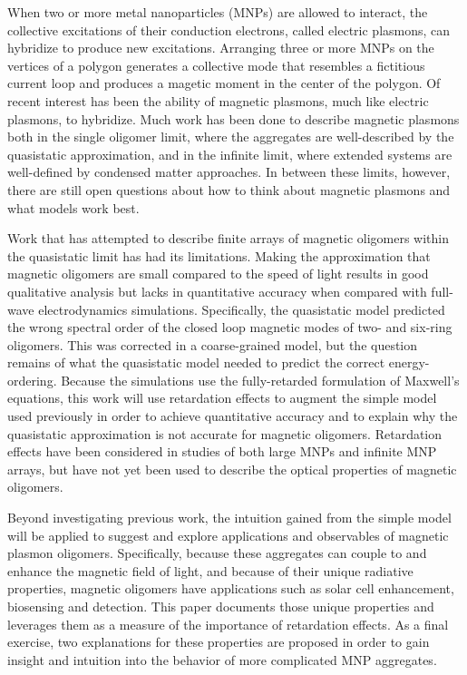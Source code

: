 \documentclass[12pt, letterpaper, twoside]{report}
\begin{document}
When two or more metal nanoparticles (MNPs) are allowed to interact, the collective excitations of their conduction electrons, called electric plasmons, can hybridize to produce new excitations\cite{Lucas1976,ARAVIND1981,Xu1995,Mischenko1995}. Arranging three or more MNPs on the vertices of a polygon generates a collective mode that resembles a fictitious current loop and produces a magetic moment in the center of the polygon\cite{Alu2006,Alu2008,Liu2011,Nord2006,Cherqui2014}. Of recent interest has been the ability of magnetic plasmons, much like electric plasmons, to hybridize\cite{Cherqui2016}. Much work has been done to describe magnetic plasmons both in the single oligomer limit\cite{}, where the aggregates are well-described by the quasistatic approximation, and in the infinite limit, where extended systems are well-defined by condensed matter approaches\cite{}. In between these limits, however, there are still open questions about how to think about magnetic plasmons and what models work best\cite{}. 

Work that has attempted to describe finite arrays of magnetic oligomers within the quasistatic limit has had its limitations\cite{Cherqui2014}. Making the approximation that magnetic oligomers are small compared to the speed of light results in good qualitative analysis but lacks in quantitative accuracy when compared with full-wave electrodynamics simulations. Specifically, the quasistatic model predicted the wrong spectral order of the closed loop magnetic modes of two- and six-ring oligomers. This was corrected in a coarse-grained model, but the question remains of what the quasistatic model needed to predict the correct energy-ordering. Because the simulations use the fully-retarded formulation of Maxwell's equations, this work will use retardation effects to augment the simple model used previously in order to achieve quantitative accuracy and to explain why the quasistatic approximation is not accurate for magnetic oligomers. Retardation effects have been considered in studies of both large MNPs and infinite MNP arrays\cite{Abajo2008,Gu2010,vonPlessen2007,Rechbacher2003,Kottman2001,Schatz2003,Royer2005,Chumanov2010}, but have not yet been used to describe the optical properties of magnetic oligomers.

Beyond investigating previous work, the intuition gained from the simple model will be applied to suggest and explore applications and observables of magnetic plasmon oligomers. Specifically, because these aggregates can couple to and enhance the magnetic field of light, and because of their unique radiative properties, magnetic oligomers have applications such as solar cell enhancement\cite{Graydon2011,Alu2014solar,Le2015solar}, biosensing and detection\cite{}. This paper documents those unique properties and leverages them as a measure of the importance of retardation effects. As a final exercise, two explanations for these properties are proposed in order to gain insight and intuition into the behavior of more complicated MNP aggregates.
\end{document}
